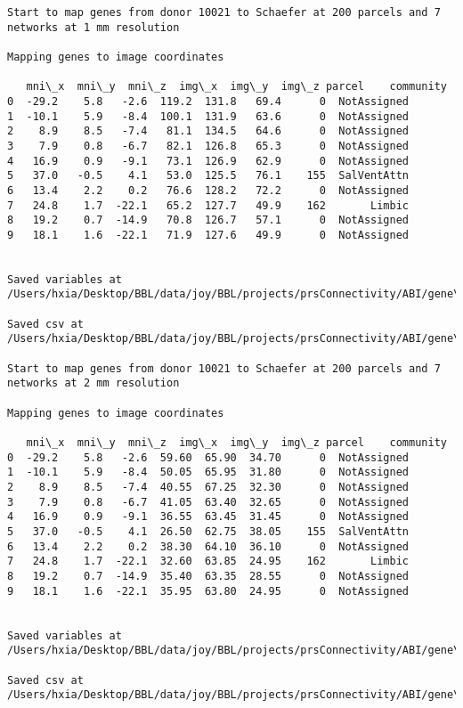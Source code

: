\documentclass[11pt]{article}
\begin{document}
\begin{Verbatim}[commandchars=\\\{\}]
Start to map genes from donor 10021 to Schaefer at 200 parcels and 7 networks at 1 mm resolution

Mapping genes to image coordinates

   mni\_x  mni\_y  mni\_z  img\_x  img\_y  img\_z parcel    community
0  -29.2    5.8   -2.6  119.2  131.8   69.4      0  NotAssigned
1  -10.1    5.9   -8.4  100.1  131.9   63.6      0  NotAssigned
2    8.9    8.5   -7.4   81.1  134.5   64.6      0  NotAssigned
3    7.9    0.8   -6.7   82.1  126.8   65.3      0  NotAssigned
4   16.9    0.9   -9.1   73.1  126.9   62.9      0  NotAssigned
5   37.0   -0.5    4.1   53.0  125.5   76.1    155  SalVentAttn
6   13.4    2.2    0.2   76.6  128.2   72.2      0  NotAssigned
7   24.8    1.7  -22.1   65.2  127.7   49.9    162       Limbic
8   19.2    0.7  -14.9   70.8  126.7   57.1      0  NotAssigned
9   18.1    1.6  -22.1   71.9  127.6   49.9      0  NotAssigned


Saved variables at /Users/hxia/Desktop/BBL/data/joy/BBL/projects/prsConnectivity/ABI/gene\_mapping/10021donor\_200Parcels\_7Network\_1mm.pkl

Saved csv at /Users/hxia/Desktop/BBL/data/joy/BBL/projects/prsConnectivity/ABI/gene\_mapping/10021donor\_200Parcels\_7Network\_1mm.csv

Start to map genes from donor 10021 to Schaefer at 200 parcels and 7 networks at 2 mm resolution

Mapping genes to image coordinates

   mni\_x  mni\_y  mni\_z  img\_x  img\_y  img\_z parcel    community
0  -29.2    5.8   -2.6  59.60  65.90  34.70      0  NotAssigned
1  -10.1    5.9   -8.4  50.05  65.95  31.80      0  NotAssigned
2    8.9    8.5   -7.4  40.55  67.25  32.30      0  NotAssigned
3    7.9    0.8   -6.7  41.05  63.40  32.65      0  NotAssigned
4   16.9    0.9   -9.1  36.55  63.45  31.45      0  NotAssigned
5   37.0   -0.5    4.1  26.50  62.75  38.05    155  SalVentAttn
6   13.4    2.2    0.2  38.30  64.10  36.10      0  NotAssigned
7   24.8    1.7  -22.1  32.60  63.85  24.95    162       Limbic
8   19.2    0.7  -14.9  35.40  63.35  28.55      0  NotAssigned
9   18.1    1.6  -22.1  35.95  63.80  24.95      0  NotAssigned


Saved variables at /Users/hxia/Desktop/BBL/data/joy/BBL/projects/prsConnectivity/ABI/gene\_mapping/10021donor\_200Parcels\_7Network\_2mm.pkl

Saved csv at /Users/hxia/Desktop/BBL/data/joy/BBL/projects/prsConnectivity/ABI/gene\_mapping/10021donor\_200Parcels\_7Network\_2mm.csv


\end{Verbatim}
\end{document}
